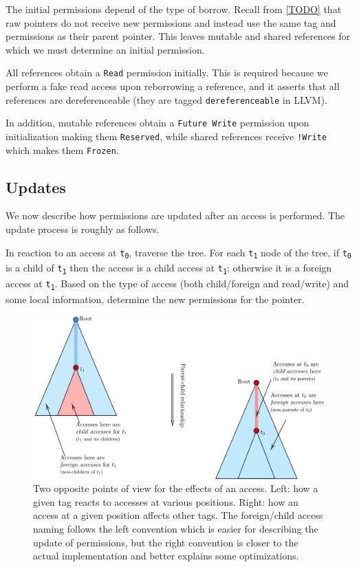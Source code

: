 \documentclass[a4paper,11pt]{article}
\theoremstyle{plain}
\theoremstyle{definition}
\theoremstyle{remark}
\newcommand{\tcode}[1]{\texttt{#1}}
\newcommand{\tperm}[1]{\texttt{#1}}
\newcommand{\tsub}[1]{\textsubscript{#1}}
\begin{document}
The initial permissions depend of the type of borrow.
Recall from \ref{TODO} that raw pointers do not receive new permissions and instead
use the same tag and permissions as their parent pointer. This leaves mutable and
shared references for which we must determine an initial permission.

All references obtain a \tperm{Read} permission initially. This is required
because we perform a fake read access upon reborrowing a reference, and it asserts
that all references are dereferenceable (they are tagged \texttt{dereferenceable}
in LLVM).

In addition, mutable references obtain a \tperm{Future Write} permission upon initialization
making them \tperm{Reserved}, while shared references receive \tperm{!Write} which makes them \tperm{Frozen}.

\subsection{Updates}

We now describe how permissions are updated after an access is performed.
The update process is roughly as follows.

In reaction to an access at \tcode{t\tsub{0}}, traverse the tree. For each \tcode{t\tsub{1}} node of the
tree, if \tcode{t\tsub{0}} is a child of \tcode{t\tsub{1}} then the access is a child access at \tcode{t\tsub{1}}; otherwise
it is a foreign access at \tcode{t\tsub{1}}. Based on the type of access (both child/foreign
and read/write) and some local information, determine the new permissions for the
pointer.

\begin{figure}
    \includegraphics[width=\textwidth]{../figs/child-or-foreign.pdf}
    \caption{Two opposite points of view for the effects of an access.
    Left: how a given tag reacts to accesses at various positions.
    Right: how an access at a given position affects other tags.
    The foreign/child access naming follows the left convention which is easier
    for describing the update of permissions, but the right convention is closer
    to the actual implementation and better explains some optimizations.}
    \label{fig:access-pov}
\end{figure}
\end{document}
